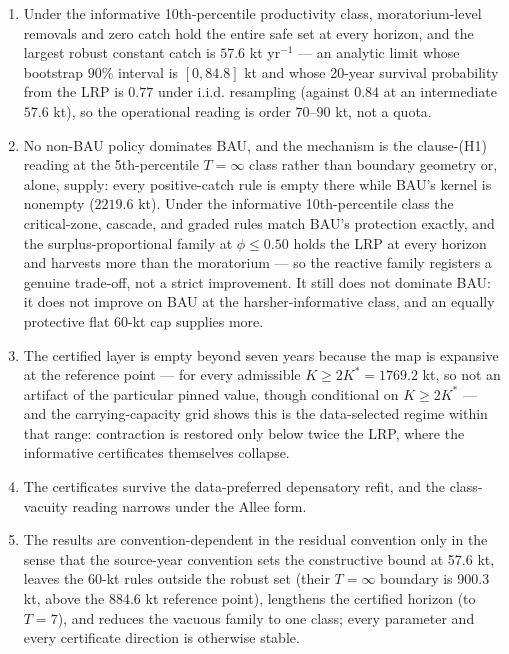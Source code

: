 \documentclass[11pt]{article}
\begin{document}
\begin{enumerate}
\def\labelenumi{(\arabic{enumi})}
\item
  Under the informative 10th-percentile productivity class,
  moratorium-level removals and zero catch hold the entire safe set at
  every horizon, and the largest robust constant catch is \(57.6\) kt
  yr\(^{-1}\) --- an analytic limit whose bootstrap \(90\%\) interval is
  \([0, 84.8]\) kt and whose 20-year survival probability from the LRP
  is \(0.77\) under i.i.d. resampling (against \(0.84\) at an
  intermediate \(57.6\) kt), so the operational reading is order
  \(70\)--\(90\) kt, not a quota.
\item
  No non-BAU policy dominates BAU, and the mechanism is the clause-(H1)
  reading at the 5th-percentile \(T=\infty\) class rather than boundary
  geometry or, alone, supply: every positive-catch rule is empty there
  while BAU's kernel is nonempty (\(2219.6\) kt). Under the informative
  10th-percentile class the critical-zone, cascade, and graded rules
  match BAU's protection exactly, and the surplus-proportional family at
  \(\phi \le 0.50\) holds the LRP at every horizon and harvests more
  than the moratorium --- so the reactive family registers a genuine
  trade-off, not a strict improvement. It still does not dominate BAU:
  it does not improve on BAU at the harsher-informative class, and an
  equally protective flat 60-kt cap supplies more.
\item
  The certified layer is empty beyond seven years because the map is
  expansive at the reference point --- for every admissible
  \(K \ge 2K^* = 1769.2\) kt, so not an artifact of the particular
  pinned value, though conditional on \(K \ge 2K^*\) --- and the
  carrying-capacity grid shows this is the data-selected regime within
  that range: contraction is restored only below twice the LRP, where
  the informative certificates themselves collapse.
\item
  The certificates survive the data-preferred depensatory refit, and the
  class-vacuity reading narrows under the Allee form.
\item
  The results are convention-dependent in the residual convention only
  in the sense that the source-year convention sets the constructive
  bound at 57.6 kt, leaves the 60-kt rules outside the robust set
  (their \(T=\infty\) boundary is 900.3 kt, above the 884.6 kt reference
  point), lengthens the certified horizon (to \(T=7\)), and reduces
  the vacuous family to one class; every parameter and every certificate
  direction is otherwise stable.
\end{enumerate}
\end{document}
